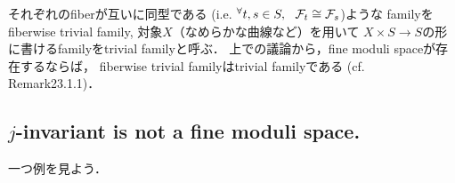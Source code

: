 \documentclass[a4paper]{jsarticle}
\newcommand{\famF}{\mathcal{F}}
\begin{document}
    それぞれのfiberが互いに同型である
    (i.e. $\Forall{t,s \in S} \famF_t \iso \famF_s$)ような
    familyをfiberwise trivial family, 
    対象$X$（なめらかな曲線など）を用いて
    $X \times S \to S$の形に書けるfamilyをtrivial familyと呼ぶ．
    上での議論から，fine moduli spaceが存在するならば，
    fiberwise trivial familyはtrivial familyである
    (cf. \cite{HarDef} Remark23.1.1)．

    \subsection{\texorpdfstring{$j$}{j}-invariant is not a fine moduli space.}
    一つ例を見よう．
\end{document}
